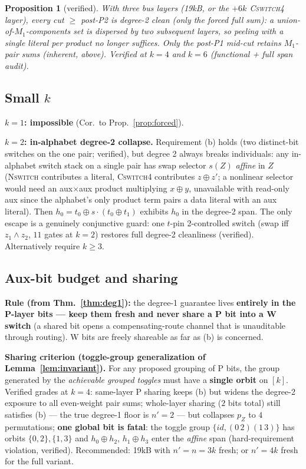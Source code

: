 \documentclass[11pt]{article}
\newtheorem{proposition}[theorem]{Proposition}
\theoremstyle{remark}
\newcommand{\NSW}{\textsc{Nswitch}}
\newcommand{\CSW}{\textsc{Cswitch4}}
\begin{document}
\begin{proposition}[verified]
With three bus layers (19kB, or the $+6k$ \CSW{} layer), every cut $\ge$ post-P2 is degree-2
clean (only the forced full sum): a union-of-$M_1$-components set is dispersed by \emph{two}
subsequent layers, so peeling with a single literal per product no longer suffices. Only the
post-P1 mid-cut retains $M_1$-pair sums (inherent, above). Verified at $k=4$ and $k=6$
(functional + full span audit).
\end{proposition}

\subsection{Small $k$}\label{sec:smallk}

\textbf{$k=1$: impossible} (Cor.\ to Prop.~\ref{prop:forced}).

\textbf{$k=2$: in-alphabet degree-2 collapse.} Requirement (b) holds (two distinct-bit switches
on the one pair; verified), but degree 2 always breaks individuals: any in-alphabet switch stack
on a single pair has swap selector $s(Z)$ \emph{affine} in $Z$ (\NSW{} contributes a literal,
\CSW{} contributes $z\oplus z'$; a nonlinear selector would need an aux$\times$aux product
multiplying $x\oplus y$, unavailable with read-only aux since the alphabet's only product term
pairs a data literal with an aux literal). Then $h_0=t_0\oplus s\cdot(t_0\oplus t_1)$ exhibits
$h_0$ in the degree-2 span. The only escape is a genuinely conjunctive guard: one $t$-pin
2-controlled switch (swap iff $z_1\wedge z_2$, $11$ gates at $k=2$) restores full degree-2
cleanliness (verified). Alternatively require $k\ge3$.

\subsection{Aux-bit budget and sharing}\label{sec:sharing}

\textbf{Rule (from Thm.~\ref{thm:deg1}):} the degree-1 guarantee lives \textbf{entirely in the
P-layer bits --- keep them fresh and never share a P bit into a W switch} (a shared bit opens a
compensating-route channel that is unauditable through routing). W bits are freely shareable as
far as (b) is concerned.

\textbf{Sharing criterion (toggle-group generalization of Lemma~\ref{lem:invariant}).} For any
proposed grouping of P bits, the group generated by the \emph{achievable grouped toggles} must
have a \textbf{single orbit} on $[k]$. Verified grades at $k=4$: same-layer P sharing keeps (b)
but widens the degree-2 exposure to all even-weight pair sums; whole-layer sharing ($2$ bits
total) still satisfies (b) --- the true degree-1 floor is $n'=2$ --- but collapses $p_Z$ to $4$
permutations; \textbf{one global bit is fatal}: the toggle group $\{id,(0\,2)(1\,3)\}$ has
orbits $\{0,2\},\{1,3\}$ and $h_0\oplus h_2$, $h_1\oplus h_3$ enter the \emph{affine} span
(hard-requirement violation, verified). Recommended: 19kB with $n'=n=3k$ fresh; or $n'=4k$
fresh for the full variant.
\end{document}

